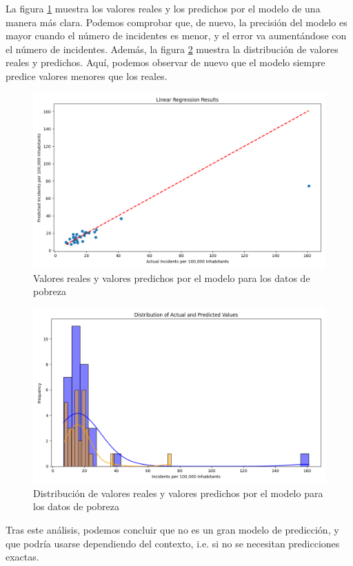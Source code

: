 \documentclass[11pt,a4paper]{article}
\begin{document}
La figura \ref{fig:pob_reg_res} muestra los valores reales y los predichos por el modelo de una manera más clara. Podemos comprobar que, de nuevo, la precisión del modelo es mayor cuando el número de incidentes es menor, y el error va aumentándose con el número de incidentes. Además, la figura \ref{fig:pob_reg_dist} muestra la distribución de valores reales y predichos. Aquí, podemos observar de nuevo que el modelo siempre predice valores menores que los reales.

\begin{figure}[H]
    \centering
    \includegraphics[width=.8\textwidth]{poverty_linear_regression_results.png}
    \caption{Valores reales y valores predichos por el modelo para los datos de pobreza}
    \label{fig:pob_reg_res}
\end{figure}

\begin{figure}[H]
    \centering
    \includegraphics[width=.8\linewidth]{poverty_linear_regression_distribution.png}
    \caption{Distribución de valores reales y valores predichos por el modelo para los datos de pobreza}
    \label{fig:pob_reg_dist}
\end{figure}

Tras este análisis, podemos concluir que no es un gran modelo de predicción, y que podría usarse dependiendo del contexto, i.e. si no se necesitan predicciones exactas.
\end{document}
